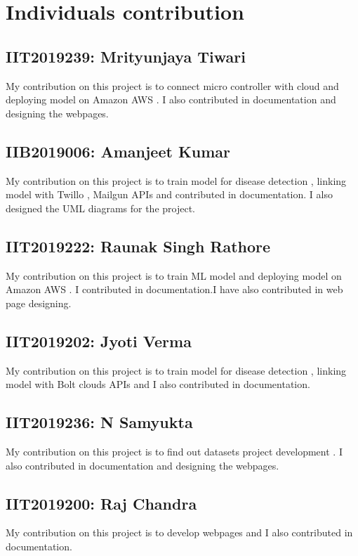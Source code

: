 \documentclass{article}
\begin{document}
\section{Individuals contribution}
\subsection{IIT2019239: Mrityunjaya Tiwari}
\large{My contribution on this project is to connect micro controller with cloud and deploying model on Amazon AWS . I also contributed in documentation and designing the webpages.}

\subsection{IIB2019006: Amanjeet Kumar}
\large{My contribution on this project is to train model for disease detection , linking model with Twillo , Mailgun APIs and contributed in documentation. I also designed the UML diagrams for the project.}

\subsection{IIT2019222: Raunak Singh Rathore}
\large{My contribution on this project is to  train ML model and deploying model on Amazon AWS . I contributed in documentation.I have also contributed in web page designing. }
%
\subsection{IIT2019202: Jyoti Verma}
\large{My contribution on this project is to train model for disease detection , linking model with Bolt clouds APIs and I also contributed in documentation.}


\subsection{IIT2019236: N Samyukta}
\large{My contribution on this project is to find out datasets project development . I also contributed in documentation and designing the webpages.}

\subsection{IIT2019200: Raj Chandra}
\large{My contribution on this project is to develop webpages and I also contributed in documentation.}
\end{document}
